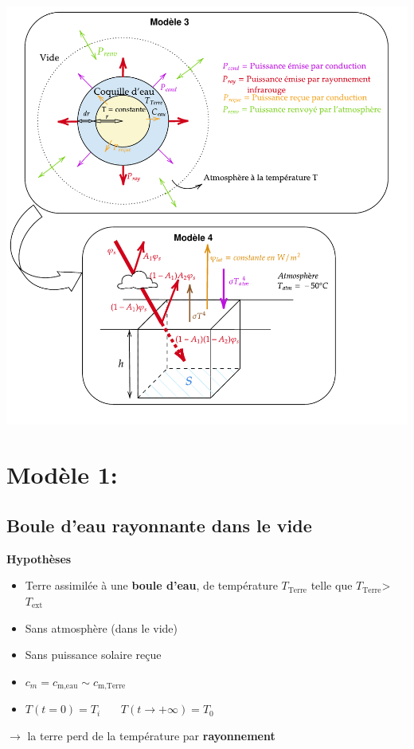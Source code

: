 \documentclass[a4paper,12pt]{article}
\begin{document}
\\
\\
\begin{center}
   \includegraphics[width=1\textwidth, angle=0]{evolution_projet_2.pdf}
\end{center}

\newpage
  
\section{Modèle 1: }
\label{sec:modèle 1}
\subsection{Boule d’eau rayonnante dans le vide}
\textbf{Hypothèses}

\begin{itemize}
    \item Terre assimilée à une \textbf{boule d'eau}, de température
    \(T_{\text{Terre}}\) telle que \(T_{\text{Terre}}\)> \(T_{\text{ext}}\)
    \item  Sans atmosphère (dans le vide)
    \item  Sans puissance solaire reçue  
    \item \(c_{m}= c_{\text{m,eau}} \sim c_{\text{m,Terre}}\) 
    \item $T(t=0) = T_i$ \ \ \
$T(t \to +\infty) = T_0$
   
\end{itemize}
$\rightarrow$ la terre perd de la température par \textbf{rayonnement}
\\ 
\end{document}

